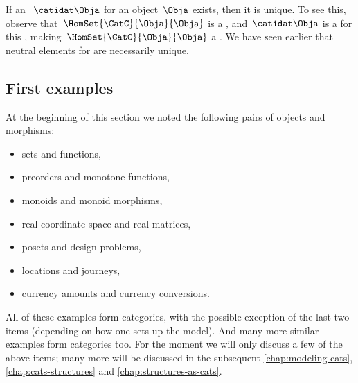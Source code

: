 \begin{remark}
    If an ~$\catidat\Obja$ for an object~$\Obja$ exists, then it is unique.
    To see this, observe that~$\HomSet{\CatC}{\Obja}{\Obja}$ is a , and~$\catidat\Obja$ is a  for this , making~$\HomSet{\CatC}{\Obja}{\Obja}$ a .
    We have seen earlier that neutral elements for  are necessarily unique.
\end{remark}


\subsection{First examples}

At the beginning of this section we noted the following pairs of objects and morphisms: 
\begin{itemize}
\item sets and functions,
\item preorders and monotone functions,
\item monoids and monoid morphisms, 
\item real coordinate space and real matrices,
\item posets and design problems,
\item locations and journeys,
\item currency amounts and currency conversions.
\end{itemize}
All of these examples form categories, with the possible exception of the last two items (depending on how one sets up the model). And many more similar examples form categories too. For the moment we will only discuss a few of the above items; many more will be discussed in the subsequent \cref{chap:modeling-cats}, \cref{chap:cats-structures} and \cref{chap:structures-as-cats}.


